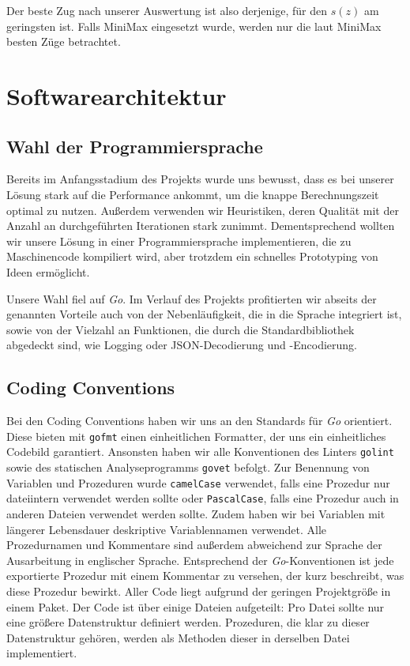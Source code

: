 \documentclass[12pt,a4paper]{article}
\begin{document}
Der beste Zug nach unserer Auswertung ist also derjenige, für den $s(z)$ am geringsten ist. Falls MiniMax eingesetzt wurde, werden nur die laut MiniMax besten Züge betrachtet.

\section{Softwarearchitektur}

\subsection{Wahl der Programmiersprache}
Bereits im Anfangsstadium des Projekts wurde uns bewusst, dass es bei unserer Lösung stark auf die Performance ankommt, um die knappe Berechnungszeit optimal zu nutzen. Außerdem verwenden wir Heuristiken, deren Qualität mit der Anzahl an durchgeführten Iterationen stark zunimmt.
Dementsprechend wollten wir unsere Lösung in einer Programmiersprache implementieren, die zu Maschinencode kompiliert wird, aber trotzdem ein schnelles Prototyping von Ideen ermöglicht.

Unsere Wahl fiel auf \textit{Go}. Im Verlauf des Projekts profitierten wir abseits der genannten Vorteile auch von der Nebenläufigkeit, die in die Sprache integriert ist, sowie von der Vielzahl an Funktionen, die durch die Standardbibliothek abgedeckt sind, wie Logging oder JSON-Decodierung und -Encodierung.

\subsection{Coding Conventions}
Bei den Coding Conventions haben wir uns an den Standards für \textit{Go} orientiert. Diese bieten mit \texttt{gofmt} einen einheitlichen Formatter, der uns ein einheitliches Codebild garantiert. Ansonsten haben wir alle Konventionen des Linters \texttt{golint} sowie des statischen Analyseprogramms \texttt{govet} befolgt. Zur Benennung von Variablen und Prozeduren wurde \texttt{camelCase} verwendet, falls eine Prozedur nur dateiintern verwendet werden sollte oder \texttt{PascalCase}, falls eine Prozedur auch in anderen Dateien verwendet werden sollte. Zudem haben wir bei Variablen mit längerer Lebensdauer deskriptive Variablennamen verwendet. Alle Prozedurnamen und Kommentare sind außerdem abweichend zur Sprache der Ausarbeitung in englischer Sprache. Entsprechend der \textit{Go}-Konventionen ist jede exportierte Prozedur mit einem Kommentar zu versehen, der kurz beschreibt, was diese Prozedur bewirkt. Aller Code liegt aufgrund der geringen Projektgröße in einem Paket. Der Code ist über einige Dateien aufgeteilt: Pro Datei sollte nur eine größere Datenstruktur definiert werden. Prozeduren, die klar zu dieser Datenstruktur gehören, werden als Methoden dieser in derselben Datei implementiert.
\end{document}
